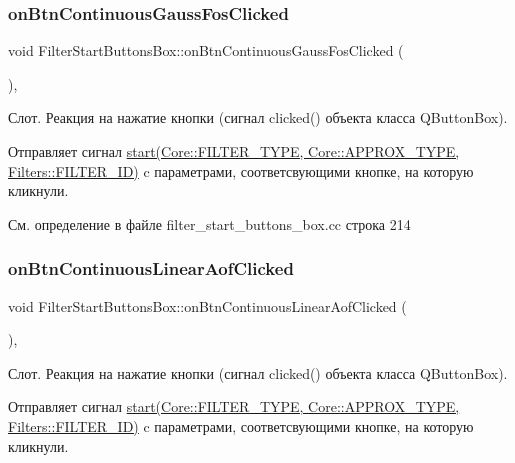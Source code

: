 \subsubsection{\texorpdfstring{on\+Btn\+Continuous\+Gauss\+Fos\+Clicked}{onBtnContinuousGaussFosClicked}}
{\footnotesize\ttfamily void Filter\+Start\+Buttons\+Box\+::on\+Btn\+Continuous\+Gauss\+Fos\+Clicked (\begin{DoxyParamCaption}{ }\end{DoxyParamCaption})\hspace{0.3cm}{\ttfamily [private]}, {\ttfamily [slot]}}

Слот. Реакция на нажатие кнопки (сигнал clicked() объекта класса Q\+Button\+Box).

Отправляет сигнал \hyperlink{class_filter_start_buttons_box_ac6e2a6555f1d388391f188f834b8e753}{start(\+Core\+::\+F\+I\+L\+T\+E\+R\+\_\+\+T\+Y\+P\+E, Core\+::\+A\+P\+P\+R\+O\+X\+\_\+\+T\+Y\+P\+E, Filters\+::\+F\+I\+L\+T\+E\+R\+\_\+\+I\+D)} c параметрами, соответсвующими кнопке, на которую кликнули. 

См. определение в файле filter\+\_\+start\+\_\+buttons\+\_\+box.\+cc строка 214

\hypertarget{class_filter_start_buttons_box_a8afe02f419e8e98bdac1846c2b7db588}{}\label{class_filter_start_buttons_box_a8afe02f419e8e98bdac1846c2b7db588} 
\subsubsection{\texorpdfstring{on\+Btn\+Continuous\+Linear\+Aof\+Clicked}{onBtnContinuousLinearAofClicked}}
{\footnotesize\ttfamily void Filter\+Start\+Buttons\+Box\+::on\+Btn\+Continuous\+Linear\+Aof\+Clicked (\begin{DoxyParamCaption}{ }\end{DoxyParamCaption})\hspace{0.3cm}{\ttfamily [private]}, {\ttfamily [slot]}}

Слот. Реакция на нажатие кнопки (сигнал clicked() объекта класса Q\+Button\+Box).

Отправляет сигнал \hyperlink{class_filter_start_buttons_box_ac6e2a6555f1d388391f188f834b8e753}{start(\+Core\+::\+F\+I\+L\+T\+E\+R\+\_\+\+T\+Y\+P\+E, Core\+::\+A\+P\+P\+R\+O\+X\+\_\+\+T\+Y\+P\+E, Filters\+::\+F\+I\+L\+T\+E\+R\+\_\+\+I\+D)} c параметрами, соответсвующими кнопке, на которую кликнули. 

